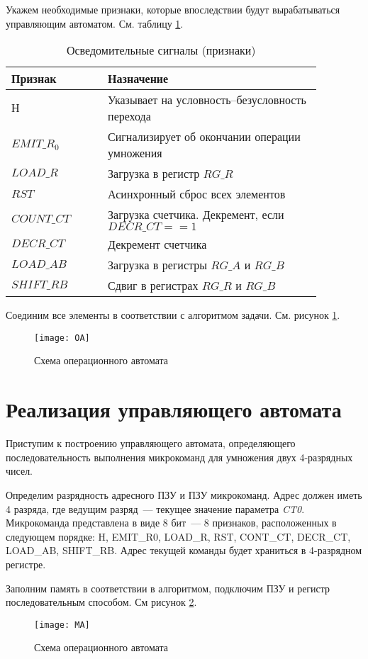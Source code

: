 \documentclass[a4paper,14pt]{extarticle}
\begin{document}
Укажем необходимые признаки, которые впоследствии будут вырабатываться управляющим автоматом. См. таблицу \ref{tab:signals}.
\begin{table}[h!]
	\centering
	\begin{tabular}{|p{0.27\linewidth}|p{0.6\linewidth}|}
		\hline
		\textbf{Признак} & \textbf{Назначение} \\ \hline
		$Н$ & Указывает на условность--безусловность перехода \\ \hline
		$EMIT\_R_0$ & Сигнализирует об окончании операции умножения \\ \hline
		$LOAD\_R$ & Загрузка в регистр $RG\_R$ \\ \hline
		$RST$ & Асинхронный сброс всех элементов \\ \hline
		$COUNT\_CT$ & Загрузка счетчика. Декремент, если $DECR\_CT==1$ \\ \hline
		$DECR\_CT$ & Декремент счетчика \\ \hline
		$LOAD\_AB$ & Загрузка в регистры $RG\_A \text{ и } RG\_B$ \\ \hline
		$SHIFT\_RB$ & Сдвиг в регистрах $RG\_R \text{ и } RG\_B$ \\ \hline
	\end{tabular}
	\caption{Осведомительные сигналы (признаки)}
	\label{tab:signals}
\end{table}
Соединим все элементы в соответствии с алгоритмом задачи. См. рисунок \ref{img:oa}.

\begin{figure}[h!]
	\centering
	\texttt{[image: OA]}
	\caption {Схема операционного автомата}
	\label{img:oa}
\end{figure}
\newpage
\section {Реализация управляющего автомата}
Приступим к построению управляющего автомата, определяющего последовательность выполнения микрокоманд для умножения двух 4-разрядных чисел. 

Определим разрядность адресного ПЗУ и ПЗУ микрокоманд. Адрес должен иметь 4 разряда, где ведущим разряд~--- текущее значение параметра \textit{CT0}. Микрокоманда представлена в виде 8 бит~--- 8 признаков, расположенных в следующем порядке: H, EMIT\_R0, LOAD\_R, RST, CONT\_CT, DECR\_CT, LOAD\_AB, SHIFT\_RB. Адрес текущей команды будет храниться в 4-разрядном регистре.


Заполним память в соответствии в алгоритмом, подключим ПЗУ и регистр последовательным способом. См рисунок \ref{img:ma}.
\begin{figure}[h!]
	\centering
	\texttt{[image: MA]}
	\caption {Схема операционного автомата}
	\label{img:ma}
\end{figure}
\end{document}
